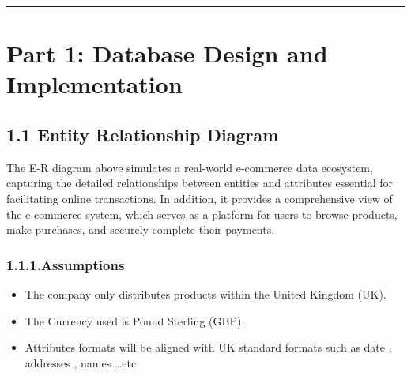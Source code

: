 \documentclass[
]{article}
\newenvironment{Shaded}{\begin{snugshade}}{\end{snugshade}}
\newcommand{\CommentTok}[1]{\textcolor[rgb]{0.56,0.35,0.01}{\textit{#1}}}
\newcommand{\DecValTok}[1]{\textcolor[rgb]{0.00,0.00,0.81}{#1}}
\newcommand{\FunctionTok}[1]{\textcolor[rgb]{0.13,0.29,0.53}{\textbf{#1}}}
\newcommand{\NormalTok}[1]{#1}
\newcommand{\OtherTok}[1]{\textcolor[rgb]{0.56,0.35,0.01}{#1}}
\newcommand{\SpecialCharTok}[1]{\textcolor[rgb]{0.81,0.36,0.00}{\textbf{#1}}}
\begin{document}
\begin{Shaded}
\end{Shaded}

\begin{center}\rule{0.5\linewidth}{0.5pt}\end{center}

\hypertarget{part-1-database-design-and-implementation}{%
\section{Part 1: Database Design and
Implementation}\label{part-1-database-design-and-implementation}}

\hypertarget{entity-relationship-diagram}{%
\subsection{1.1 Entity Relationship
Diagram}\label{entity-relationship-diagram}}

The E-R diagram above simulates a real-world e-commerce data ecosystem,
capturing the detailed relationships between entities and attributes
essential for facilitating online transactions. In addition, it provides
a comprehensive view of the e-commerce system, which serves as a
platform for users to browse products, make purchases, and securely
complete their payments.

\hypertarget{assumptions}{%
\subsubsection{1.1.1.Assumptions}\label{assumptions}}

\begin{itemize}
\item
  The company only distributes products within the United Kingdom (UK).
\item
  The Currency used is Pound Sterling (GBP).
\item
  Attributes formats will be aligned with UK standard formats such as
  date , addresses , names \ldots etc
\end{itemize}
\end{document}
